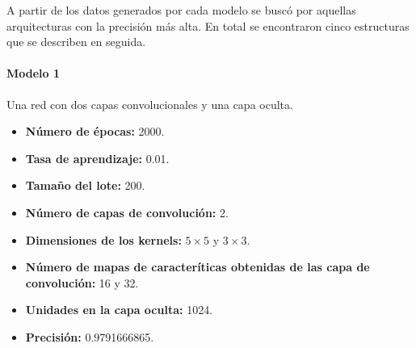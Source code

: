 A partir de los datos generados por cada modelo se
buscó por aquellas arquitecturas con la precisión más alta.
En total se encontraron cinco estructuras que se describen en seguida.

\paragraph{Modelo 1}

Una red con dos capas convolucionales y una capa oculta.

\begin{itemize}
\item \textbf{Número de épocas:} 2000.
\item \textbf{Tasa de aprendizaje:} 0.01.
\item \textbf{Tamaño del lote:} 200.
\item \textbf{Número de capas de convolución:} 2.
\item \textbf{Dimensiones de los kernels:} $5 \times 5$ y $3 \times 3$.
\item \textbf{Número de mapas de caracteríticas obtenidas de las capa de convolución:} 16 y 32.
\item \textbf{Unidades en la capa oculta:} 1024.
\item \textbf{Precisión:} 0.9791666865.
\end{itemize}


